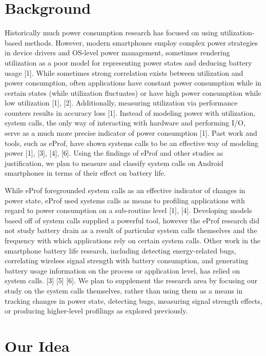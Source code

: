 \documentclass[11pt]{article}
\begin{document}
\section{Background}

Historically much power consumption research has focused on using utilization-based
methods.  However, modern smartphones employ complex power strategies in device 
drivers and OS-level power management, sometimes rendering utilization as a poor 
model for representing power states and deducing battery usage [1].  While 
sometimes strong correlation exists between utilization and power consumption, often 
applications have constant power consumption while in certain states (while 
utilization fluctuates) or have high power consumption while low utilization [1], [2].  
Additionally, measuring utilization via performance counters results in accuracy 
loss [1].  Instead of modeling power with utilization, system calls, the only way of 
interacting with hardware and performing I/O, serve as a much more precise indicator 
of power consumption [1].  Past work and tools, such as eProf, have shown systems 
calls to be an effective way of modeling power [1], [3], [4], [6].  Using the findings 
of eProf and other studies as justification, we plan to measure and classify system 
calls on Android smartphones in terms of their effect on battery life.

While eProf foregrounded system calls as an effective indicator of changes in power
state, eProf used systems calls as means to profiling applications with regard to power 
consumption on a sub-routine level [1], [4].  Developing models based off of system 
calls supplied a powerful tool, however the eProf research did not study battery drain 
as a result of  particular system calls themselves and the frequency with which 
applications rely on certain system calls.  Other work in the smartphone battery life 
research, including detecting energy-related bugs, correlating wireless signal strength 
with battery consumption, and generating battery usage information on the process or 
application level, has relied on system calls. [3] [5] [6].  We plan to supplement the 
research area by focusing our study on the system calls themselves, rather than using 
them as a means in tracking changes in power state, detecting bugs, measuring signal 
strength effects, or producing higher-level profilings as explored previously.


\section{Our Idea}
\end{document}

